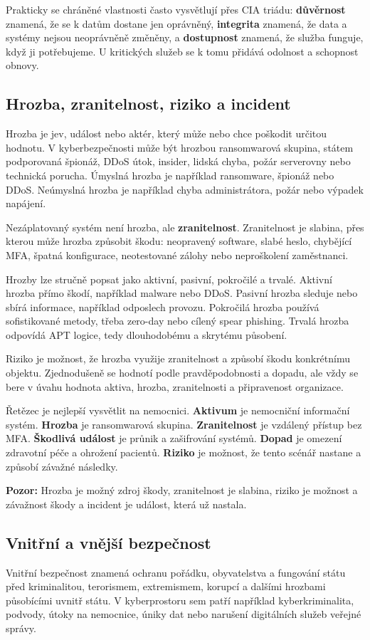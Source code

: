 \documentclass[11pt,a4paper]{article}
\newcommand{\pozor}[1]{\begin{tcolorbox}[breakable,enhanced,colback=red!7,colframe=red!30!black,boxrule=0pt,arc=1mm,left=5pt,right=5pt,top=5pt,bottom=5pt,before skip=6pt,after skip=6pt]\textbf{Pozor:} #1\end{tcolorbox}}
\begin{document}
Prakticky se chráněné vlastnosti často vysvětlují přes CIA triádu: \textbf{důvěrnost} znamená, že se k datům dostane jen oprávněný, \textbf{integrita} znamená, že data a systémy nejsou neoprávněně změněny, a \textbf{dostupnost} znamená, že služba funguje, když ji potřebujeme. U kritických služeb se k tomu přidává odolnost a schopnost obnovy.

\subsection*{Hrozba, zranitelnost, riziko a incident}
Hrozba je jev, událost nebo aktér, který může nebo chce poškodit určitou hodnotu. V kyberbezpečnosti může být hrozbou ransomwarová skupina, státem podporovaná špionáž, DDoS útok, insider, lidská chyba, požár serverovny nebo technická porucha. Úmyslná hrozba je například ransomware, špionáž nebo DDoS. Neúmyslná hrozba je například chyba administrátora, požár nebo výpadek napájení.

Nezáplatovaný systém není hrozba, ale \textbf{zranitelnost}. Zranitelnost je slabina, přes kterou může hrozba způsobit škodu: neopravený software, slabé heslo, chybějící MFA, špatná konfigurace, neotestované zálohy nebo neproškolení zaměstnanci.

Hrozby lze stručně popsat jako aktivní, pasivní, pokročilé a trvalé. Aktivní hrozba přímo škodí, například malware nebo DDoS. Pasivní hrozba sleduje nebo sbírá informace, například odposlech provozu. Pokročilá hrozba používá sofistikované metody, třeba zero-day nebo cílený spear phishing. Trvalá hrozba odpovídá APT logice, tedy dlouhodobému a skrytému působení.

Riziko je možnost, že hrozba využije zranitelnost a způsobí škodu konkrétnímu objektu. Zjednodušeně se hodnotí podle pravděpodobnosti a dopadu, ale vždy se bere v úvahu hodnota aktiva, hrozba, zranitelnosti a připravenost organizace.

Řetězec je nejlepší vysvětlit na nemocnici. \textbf{Aktivum} je nemocniční informační systém. \textbf{Hrozba} je ransomwarová skupina. \textbf{Zranitelnost} je vzdálený přístup bez MFA. \textbf{Škodlivá událost} je průnik a zašifrování systémů. \textbf{Dopad} je omezení zdravotní péče a ohrožení pacientů. \textbf{Riziko} je možnost, že tento scénář nastane a způsobí závažné následky.

\pozor{Hrozba je možný zdroj škody, zranitelnost je slabina, riziko je možnost a závažnost škody a incident je událost, která už nastala.}

\subsection*{Vnitřní a vnější bezpečnost}
Vnitřní bezpečnost znamená ochranu pořádku, obyvatelstva a fungování státu před kriminalitou, terorismem, extremismem, korupcí a dalšími hrozbami působícími uvnitř státu. V kyberprostoru sem patří například kyberkriminalita, podvody, útoky na nemocnice, úniky dat nebo narušení digitálních služeb veřejné správy.
\end{document}
